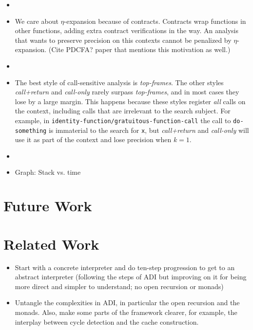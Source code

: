 \documentclass[12pt, oneside]{book}
\begin{document}
\begin{itemize}
  \item 
  
  \item We care about \(η\)-expansion because of contracts. Contracts wrap functions in other functions, adding extra contract verifications in the way. An analysis that wants to preserve precision on this contexts cannot be penalized by \(η\)-expansion. (Cite PDCFA? paper that mentions this motivation as well.)
  
  \item 
  
  \item The best style of call-sensitive analysis is \emph{top-frames}. The other styles \emph{call+return} and \emph{call-only} rarely surpass \emph{top-frames}, and in most cases they lose by a large margin. This happens because these styles register \emph{all} calls on the context, including calls that are irrelevant to the search subject. For example, in \texttt{identity-function/gratuitous-function-call} the call to \texttt{do-something} is immaterial to the search for \texttt{x}, but \emph{call+return} and \emph{call-only} will use it as part of the context and lose precision when \(k = 1\).
  
  \item 
  
  \item Graph: Stack vs. time  
\end{itemize}

\chapter{Future Work}
\label{section:future-work}

\chapter{Related Work}
\label{section:related-work}

\begin{itemize}
  \item Start with a concrete interpreter and do ten-step progression to get to an abstract interpreter (following the steps of ADI but improving on it for being more direct and simpler to understand; no open recursion or monads)
  \item Untangle the complexities in ADI, in particular the open recursion and the monads. Also, make some parts of the framework clearer, for example, the interplay between cycle detection and the cache construction.
\end{itemize}
\end{document}

